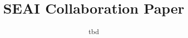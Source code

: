 \documentclass[sigconf,review,anonymous]{acmart}
\begin{document}
\title{SEAI Collaboration Paper}
	
	\author{tbd}

		\maketitle

	
\end{document}
